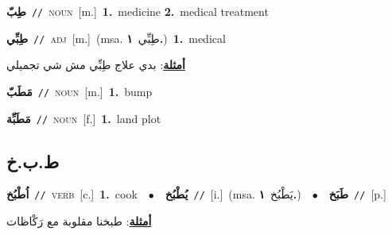 \documentclass[10pt,a4paper,twoside]{article} %
\begin{document}
\begin{multicols}{2}
{{{\setlength\topsep{0pt}\textbf{\foreignlanguage{arabic}{طِبّ}}\ {\color{gray}\texttt{//}\color{black}}\ \textsc{noun}\ [m.]\ \textbf{1.}~medicine  \textbf{2.}~medical treatment\ 

{\setlength\topsep{0pt}\textbf{\foreignlanguage{arabic}{طِبِّي}}\ {\color{gray}\texttt{//}\color{black}}\ \textsc{adj}\ [m.]\ \color{gray}(msa. \foreignlanguage{arabic}{طِبِّي}~\foreignlanguage{arabic}{\textbf{١.}})\color{black}\ \textbf{1.}~medical\  \begin{flushright}\color{gray}\foreignlanguage{arabic}{\textbf{\underline{\foreignlanguage{arabic}{أمثلة}}}: بدي علاج طِبِّي مش شي تجميلي}\end{flushright}\color{black}} \vspace{2mm}

{\setlength\topsep{0pt}\textbf{\foreignlanguage{arabic}{مَطَبّ}}\ {\color{gray}\texttt{//}\color{black}}\ \textsc{noun}\ [m.]\ \textbf{1.}~bump\ 

{\setlength\topsep{0pt}\textbf{\foreignlanguage{arabic}{مَطَبِّة}}\ {\color{gray}\texttt{//}\color{black}}\ \textsc{noun}\ [f.]\ \textbf{1.}~land plot\ 

\vspace{-3mm}
\subsection*{\color{blue}\foreignlanguage{arabic}{ط.ب.خ}\color{blue}{}} 

{\setlength\topsep{0pt}\textbf{\foreignlanguage{arabic}{اُطْبُخ}}\ {\color{gray}\texttt{//}\color{black}}\ \textsc{verb}\ [c.]\ \textbf{1.}~cook\ \ $\bullet$\ \ \setlength\topsep{0pt}\textbf{\foreignlanguage{arabic}{يُطْبُخ}}\ {\color{gray}\texttt{//}\color{black}}\ [i.]\ \color{gray}(msa. \foreignlanguage{arabic}{يَطْبُخ}~\foreignlanguage{arabic}{\textbf{١.}})\color{black}\ \ $\bullet$\ \ \setlength\topsep{0pt}\textbf{\foreignlanguage{arabic}{طَبَخ}}\ {\color{gray}\texttt{//}\color{black}}\ [p.]\  \begin{flushright}\color{gray}\foreignlanguage{arabic}{\textbf{\underline{\foreignlanguage{arabic}{أمثلة}}}: طبخنا مقلوبة مع رَكْاظات}\end{flushright}\color{black}} \vspace{2mm}

}}}}}
\end{multicols}
\end{document}
